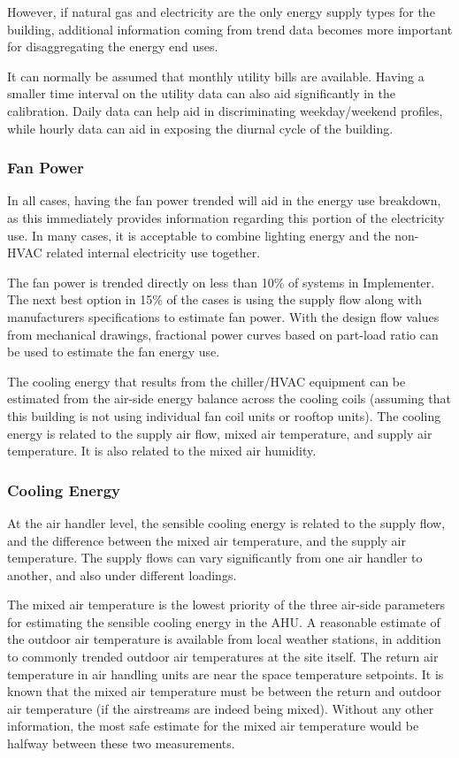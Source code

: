 However, if natural gas and electricity are the only energy supply types
for the building, additional information coming from trend data becomes
more important for disaggregating the energy end uses. 

It can normally be assumed that monthly utility bills are available.
Having a smaller time interval on the utility data can also aid
significantly in the calibration. Daily data can help aid in
discriminating weekday/weekend profiles, while hourly data can aid in
exposing the diurnal cycle of the building. 


\subsubsection{Fan Power}

In all cases, having the fan power trended will aid in the energy use
breakdown, as this immediately provides information regarding this
portion of the electricity use.  In many cases, it is acceptable to
combine lighting energy and the non-HVAC related internal electricity
use together. 

The fan power is trended directly on less than 10\% of systems in
Implementer. The next best option in 15\% of the cases is using the
supply flow along with manufacturers specifications to estimate
fan power. With the design flow values from mechanical drawings,
fractional power curves based on part-load ratio can be used to estimate
the fan energy use. 

The cooling energy that results from the chiller/HVAC equipment can be
estimated from the air-side energy balance across the cooling coils
(assuming that this building is not using individual fan coil units or
rooftop units). The cooling energy is related to the supply air flow,
mixed air temperature, and supply air temperature. It is also related to the mixed
air humidity. 


\subsubsection{Cooling Energy} At the air handler level, the sensible
cooling energy is related to the supply flow, and the difference between
the mixed air temperature, and the supply air temperature. The supply
flows can vary significantly from one air handler to another, and also
under different loadings. 

The mixed air temperature is the lowest priority of the three air-side
parameters for estimating the sensible cooling energy in the AHU. A
reasonable estimate of the outdoor air temperature is available from
local weather stations, in addition to commonly trended outdoor air
temperatures at the site itself. The return air temperature in air
handling units are near the space temperature setpoints. It is known
that the mixed air temperature must be between the return and outdoor
air temperature (if the airstreams are indeed being mixed). Without any
other information, the most safe estimate for the mixed air temperature
would be halfway between these two measurements. 


